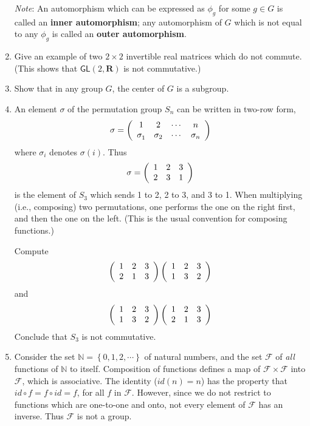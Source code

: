 \documentclass{amsbook}
\theoremstyle{plain}
\numberwithin{equation}{chapter}
\numberwithin{theorem}{chapter}
\begin{document}
\begin{enumerate}
\textit{Note}: An automorphism which can be expressed as $\phi_{g}$ for some
$g\in G$ is called an \textbf{inner automorphism}; any automorphism of $G$
which is not equal to any $\phi_{g}$ is called an \textbf{outer automorphism}.

\item \label{gl2}Give an example of two $2\times2$ invertible real matrices
which do not commute. (This shows that $\mathsf{GL}(2,\mathbf{R})$ is not commutative.)

\item  Show that in any group $G$, the center of $G$ is a subgroup.

\item \label{sn}An element $\sigma$ of the permutation group $S_{n}$ can be
written in two-row form,
\[
\sigma=\left(
\begin{array}
[c]{cccc}%
1 & 2 & \cdots &  n\\
\sigma_{1}^{{}} & \sigma_{2} & \cdots & \sigma_{n}%
\end{array}
\right)
\]
where $\sigma_{i}$ denotes $\sigma(i)$. Thus
\[
\sigma=\left(
\begin{array}
[c]{ccc}%
1 & 2 & 3\\
2 & 3 & 1
\end{array}
\right)
\]
is the element of $S_{3}$ which sends 1 to 2, 2 to 3, and 3 to 1. When
multiplying (i.e., composing) two permutations, one performs the one on the
right first, and then the one on the left. (This is the usual convention for
composing functions.)

Compute
\[
\left(
\begin{array}
[c]{ccc}%
1 & 2 & 3\\
2 & 1 & 3
\end{array}
\right)  \left(
\begin{array}
[c]{ccc}%
1 & 2 & 3\\
1 & 3 & 2
\end{array}
\right)
\]
and
\[
\left(
\begin{array}
[c]{ccc}%
1 & 2 & 3\\
1 & 3 & 2
\end{array}
\right)  \left(
\begin{array}
[c]{ccc}%
1 & 2 & 3\\
2 & 1 & 3
\end{array}
\right)
\]
Conclude that $S_{3}$ is not commutative.

\item \label{counter-example}Consider the set $\mathbb{N}\mathbf{=}\left\{
0,1,2,\cdots\right\}  $ of natural numbers, and the set $\mathcal{F}$ of
\textit{all} functions of $\mathbb{N}$ to itself. Composition of functions
defines a map of $\mathcal{F}\times\mathcal{F}$ into $\mathcal{F}$, which is
associative. The identity ($id(n)=n$) has the property that $id\circ f=f\circ
id=f$, for all $f$ in $\mathcal{F}$. However, since we do not restrict to
functions which are one-to-one and onto, not every element of $\mathcal{F}$
has an inverse. Thus $\mathcal{F}$ is not a group.


\end{enumerate}
\end{document}
